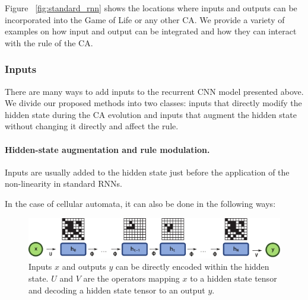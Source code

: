Figure ~\ref{fig:standard_rnn} shows the locations where inputs and 
outputs can be incorporated into the Game of Life or any other \ac{CA}. 
We provide a variety of examples on how input and output can be integrated 
and how they can interact with the rule of the \ac{CA}.


\subsubsection{Inputs}
There are many ways to add inputs to the recurrent \ac{CNN} model presented
above. We divide our proposed methods into two classes: inputs that directly
modify the hidden state during the CA evolution and inputs that augment the
hidden state without changing it directly and affect the rule.


\paragraph{Hidden-state augmentation and rule modulation.}
Inputs are usually added to the hidden state just before the application of the
non-linearity in standard RNNs.

In the case of cellular automata, it can also be done in the following ways:

\begin{figure}[ht]
  \centering
  \includegraphics[width=.9\linewidth]{figures/encode_decode.pdf}
  \caption{\label{fig:encode_decode} Inputs $x$ and outputs $y$ can be directly
    encoded within the hidden state. $U$ and $V$ are the operators mapping $x$ 
    to a hidden state tensor and decoding a hidden state tensor to an output $y$.}
\end{figure}

